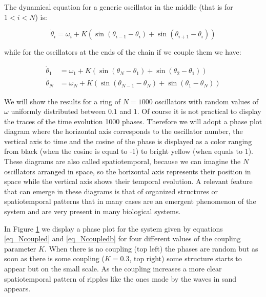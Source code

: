 \documentclass{article}
\begin{document}
The dynamical equation for a generic oscillator in the middle (that is for $1<i<N$) is:

\begin{equation} \label{eq_Ncoupled}
    \dot{\theta}_i = \omega_i + K \left(\sin(\theta_{i-1} - \theta_i)+\sin(\theta_{i+1} - \theta_i)\right)  
\end{equation}

while for the oscillators at the ends of the chain if we couple
them we have:

\begin{subequations} \label{eq_Ncoupledb}
\begin{align} 
    \dot{\theta}_1 &= \omega_1 + K \left(\sin(\theta_{N}
    - \theta_1)+\sin(\theta_{2} - \theta_1)\right) \\  
     \dot{\theta}_N &= \omega_N + K \left(\sin(\theta_{N-1}
    - \theta_N)+\sin(\theta_{1} - \theta_N)\right)  
\end{align}
\end{subequations}

\begin{figure} [h]
    \centerline{}
    \caption{}
    \label{fig_noscoupled}
\end{figure}


We will show the results for a ring of $N=1000$ oscillators with random values of $\omega$ uniformly distributed between $0.1$ and $1$. Of course it is not practical to display the traces of the time evolution 1000 phases. 
Therefore we will adopt a phase plot diagram where the horizontal axis corresponds to the oscillator number, the vertical axis to time and the cosine of the phase is displayed as a color ranging from black (when the cosine is equal to -1) to bright yellow (when equals to 1). 
These diagrams are also called spatiotemporal, because we can imagine the $N$ oscillators arranged in space, so the horizontal axis represents their position in space while the vertical axis shows their temporal evolution. 
A relevant feature that can emerge in these diagrams is that of organized structures or spatiotemporal patterns that in many cases are an emergent phenomenon of the system and are very present in many biological systems.

In Figure \ref{fig_noscoupled} we display a phase plot for the system given by equations \ref{eq_Ncoupled} and \ref{eq_Ncoupledb} for four different values of the coupling parameter $K$. 
When there is no coupling (top left) the phases are random but as soon as there is some coupling ($K=0.3$, top right) some structure starts to appear but on the small scale. As the coupling increases a more clear spatiotemporal pattern of ripples like the ones made by the waves in sand appears. 
\end{document}
